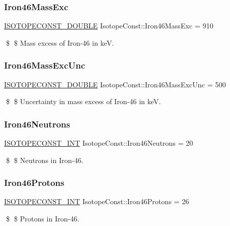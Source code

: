 \subsubsection{\texorpdfstring{Iron46\+Mass\+Exc}{Iron46MassExc}}
{\footnotesize\ttfamily \mbox{\hyperlink{group___isotope_const-_macros_ga8f45a7272ce02c0b4c65c44636ed719a}{I\+S\+O\+T\+O\+P\+E\+C\+O\+N\+S\+T\+\_\+\+D\+O\+U\+B\+LE}} Isotope\+Const\+::\+Iron46\+Mass\+Exc = 910}

\$ \$ Mass excess of Iron-\/46 in keV. \mbox{\label{group___isotope_const-_iron-_fe46_ga6873ee3056cd7a050402e5da3864e7ec}} 
\subsubsection{\texorpdfstring{Iron46\+Mass\+Exc\+Unc}{Iron46MassExcUnc}}
{\footnotesize\ttfamily \mbox{\hyperlink{group___isotope_const-_macros_ga8f45a7272ce02c0b4c65c44636ed719a}{I\+S\+O\+T\+O\+P\+E\+C\+O\+N\+S\+T\+\_\+\+D\+O\+U\+B\+LE}} Isotope\+Const\+::\+Iron46\+Mass\+Exc\+Unc = 500}

\$ \$ Uncertainty in mass excess of Iron-\/46 in keV. \mbox{\label{group___isotope_const-_iron-_fe46_ga152353a44b009a73643d2a928af6af60}} 
\subsubsection{\texorpdfstring{Iron46\+Neutrons}{Iron46Neutrons}}
{\footnotesize\ttfamily \mbox{\hyperlink{group___isotope_const-_macros_ga5f18360b3e99483a35c32d789e62621c}{I\+S\+O\+T\+O\+P\+E\+C\+O\+N\+S\+T\+\_\+\+I\+NT}} Isotope\+Const\+::\+Iron46\+Neutrons = 20}

\$ \$ Neutrons in Iron-\/46. \mbox{\label{group___isotope_const-_iron-_fe46_ga31698ea184af403580fe9b990fb15945}} 
\subsubsection{\texorpdfstring{Iron46\+Protons}{Iron46Protons}}
{\footnotesize\ttfamily \mbox{\hyperlink{group___isotope_const-_macros_ga5f18360b3e99483a35c32d789e62621c}{I\+S\+O\+T\+O\+P\+E\+C\+O\+N\+S\+T\+\_\+\+I\+NT}} Isotope\+Const\+::\+Iron46\+Protons = 26}

\$ \$ Protons in Iron-\/46. 